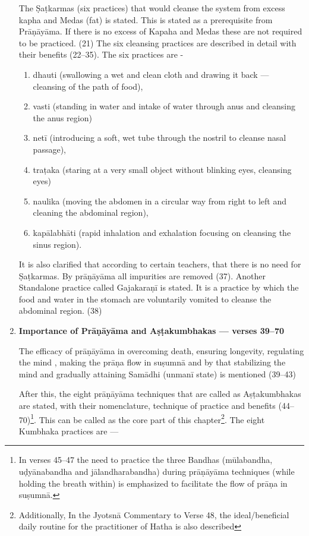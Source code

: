 \begin{enumerate}
The Ṣaṭkarmas (six practices)  that would cleanse the system from excess kapha and Medas (fat) is stated. This is stated as a prerequisite from Prāṇāyāma. If there is no excess of Kapaha and Medas these are not required to be practiced.  (21) The six cleansing practices are described in detail with their benefits (22--35). The six practices are  -
\begin{enumerate}
\item dhauti (swallowing a wet and clean cloth and drawing it back --- cleansing of the path of food), 
\item vasti (standing in water and intake of water through anus and cleansing the anus region)          
\item netī (introducing a soft, wet tube through the nostril to cleanse nasal passage),                                  
\item traṭaka (staring at a very small object without blinking eyes, cleansing eyes)                            
\item naulika (moving the abdomen in a circular way from right to left and cleaning the abdominal region), 
\item kapālabhāti (rapid inhalation and exhalation focusing on cleansing the sinus region).
\end{enumerate}

It is also clarified that according to certain teachers, that there is no need for Ṣaṭkarmas. By prāṇāyāma all impurities are removed (37). Another Standalone practice called Gajakaraṇī is stated. It is a practice by which the food and water in the stomach are voluntarily vomited to cleanse the abdominal region. (38) 

\item \textbf{Importance of Prāṇāyāma and Aṣṭakumbhakas --- verses 39--70}

The efficacy of prāṇāyāma in overcoming death, ensuring longevity, regulating the mind , making the prāṇa flow in suṣumnā and by that stabilizing the mind and gradually attaining Samādhi (unmanī state) is mentioned (39--43)

After this, the eight prāṇāyāma techniques that are called as Aṣṭakumbhakas are stated, with their nomenclature, technique of practice and benefits (44--70)\footnote{In verses 45--47 the need to practice the three Bandhas (mūlabandha, uḍyānabandha and jālandharabandha) during prāṇāyāma techniques  (while holding the breath within) is emphasized to facilitate the flow of prāṇa in suṣumnā.}. This can be called as the core part of this chapter\footnote{Additionally, In the Jyotsnā Commentary to Verse 48, the ideal/beneficial daily routine for the practitioner of Hatha is also described}. The eight Kumbhaka practices are ---


\end{enumerate}
